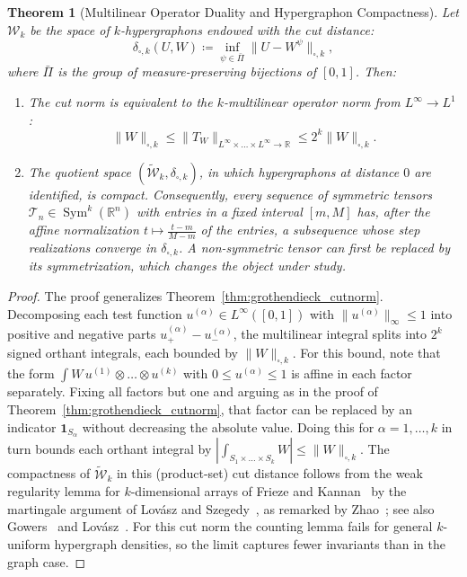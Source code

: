 \documentclass[11pt,a4paper,reqno]{amsart}
\newtheorem{theorem}{Theorem}[section]
\theoremstyle{definition}
\numberwithin{equation}{section}
\providecommand{\R}{\mathbb{R}}
\begin{document}
\begin{theorem}[Multilinear Operator Duality and Hypergraphon Compactness]
\label{thm:hypergraphon_compactness}
Let $\mathcal{W}_k$ be the space of $k$-hypergraphons endowed with the cut distance:
\begin{equation}
    \delta_{\square, k}(U, W) \coloneqq \inf_{\psi \in \bar{\Pi}} \|U - W^\psi\|_{\square, k},
\end{equation}
where $\bar{\Pi}$ is the group of measure-preserving bijections of $[0, 1]$. Then:
\begin{enumerate}[label=(\roman*)]
    \item The cut norm is equivalent to the $k$-multilinear operator norm from $L^\infty \to L^1$:
    \begin{equation}
        \|W\|_{\square, k} \le \|T_W\|_{L^\infty \times \dots \times L^\infty \to \R} \le 2^k \|W\|_{\square, k}.
    \end{equation}
    \item The quotient space $(\widetilde{\mathcal{W}}_k, \delta_{\square, k})$, in which hypergraphons at distance $0$ are identified, is \emph{compact}. Consequently, every sequence of symmetric tensors $\mathcal{T}_n \in \operatorname{Sym}^k(\R^n)$ with entries in a fixed interval $[m, M]$ has, after the affine normalization $t \mapsto \frac{t-m}{M-m}$ of the entries, a subsequence whose step realizations converge in $\delta_{\square,k}$. A non-symmetric tensor can first be replaced by its symmetrization, which changes the object under study.
\end{enumerate}
\end{theorem}
\begin{proof}
The proof generalizes Theorem~\ref{thm:grothendieck_cutnorm}. Decomposing each test function $u^{(\alpha)} \in L^\infty([0, 1])$ with $\|u^{(\alpha)}\|_\infty \le 1$ into positive and negative parts $u_+^{(\alpha)} - u_-^{(\alpha)}$, the multilinear integral splits into $2^k$ signed orthant integrals, each bounded by $\|W\|_{\square, k}$. For this bound, note that the form $\int W\, u^{(1)} \otimes \dots \otimes u^{(k)}$ with $0 \le u^{(\alpha)} \le 1$ is affine in each factor separately. Fixing all factors but one and arguing as in the proof of Theorem~\ref{thm:grothendieck_cutnorm}, that factor can be replaced by an indicator $\mathbf{1}_{S_\alpha}$ without decreasing the absolute value. Doing this for $\alpha = 1, \dots, k$ in turn bounds each orthant integral by $\left|\int_{S_1 \times \dots \times S_k} W\right| \le \|W\|_{\square, k}$. The compactness of $\widetilde{\mathcal{W}}_k$ in this (product-set) cut distance follows from the weak regularity lemma for $k$-dimensional arrays of Frieze and Kannan~\cite{frieze1999quick} by the martingale argument of Lov\'asz and Szegedy~\cite{lovasz2007szemeredi}, as remarked by Zhao~\cite[\S 3]{zhao2015hypergraph}; see also Gowers~\cite{gowers2007hypergraph} and Lov{\'a}sz~\cite{lovasz2012large}. For this cut norm the counting lemma fails for general $k$-uniform hypergraph densities, so the limit captures fewer invariants than in the graph case.
\end{proof}
\end{document}
